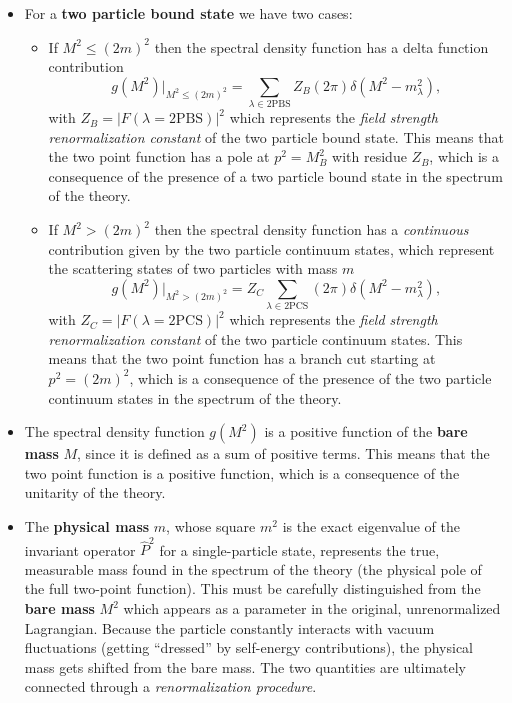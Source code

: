 \begin{itemize}
    \item For a \textbf{two particle bound state} we have two cases:
          \begin{itemize}
              \item If \(M^2 \leq (2m)^2\) then the spectral density function has a delta function contribution
                    \[
                        g(M^2) \Big|_{M^2 \leq (2m)^2} = \sum_{\lambda \in \text{2PBS}} Z_B (2\pi) \delta(M^2 - m_\lambda^2),
                    \]
                    with \(Z_B = \vert F(\lambda = \text{2PBS}) \vert^2 \) which represents the \textit{field strength renormalization constant} of the two particle bound state. This means that the two point function has a pole at \(p^2 = M_B^2\) with residue \(Z_B\), which is a consequence of the presence of a two particle bound state in the spectrum of the theory.
              \item If \(M^2 > (2m)^2\) then the spectral density function has a \textit{continuous} contribution given by the two particle continuum states, which represent the scattering states of two particles with mass \(m\)
                    \[
                        g(M^2) \Big|_{M^2 > (2m)^2} = Z_C \sum_{\lambda \in \text{2PCS}} (2\pi) \delta(M^2 - m_\lambda^2),
                    \]
                    with \(Z_C = \vert F(\lambda = \text{2PCS}) \vert^2 \) which represents the \textit{field strength renormalization constant} of the two particle continuum states. This means that the two point function has a branch cut starting at \(p^2 = (2m)^2\), which is a consequence of the presence of the two particle continuum states in the spectrum of the theory.
          \end{itemize}
    \item The spectral density function \(g(M^2)\) is a positive function of the \textbf{bare mass} \(M\), since it is defined as a sum of positive terms. This means that the two point function is a positive function, which is a consequence of the unitarity of the theory.
    \item The \textbf{physical mass} $m$, whose square $m^2$ is the exact eigenvalue of the invariant operator $\hat{P}^2$ for a single-particle state, represents the true, measurable mass found in the spectrum of the theory (the physical pole of the full two-point function). This must be carefully distinguished from the \textbf{bare mass} $M^2$ which appears as a parameter in the original, unrenormalized Lagrangian. Because the particle constantly interacts with vacuum fluctuations (getting ``dressed'' by self-energy contributions), the physical mass gets shifted from the bare mass. The two quantities are ultimately connected through a \textit{renormalization procedure}.
\end{itemize}

